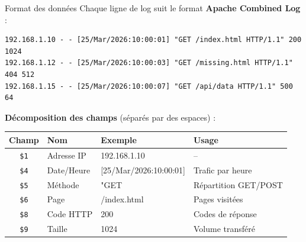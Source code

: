 \documentclass[aspectratio=169, 11pt]{beamer}
\begin{document}
\begin{frame}[fragile]{Format des données}
  Chaque ligne de log suit le format \textbf{Apache Combined Log} :

  \vspace{0.3em}
  \begin{lstlisting}[basicstyle=\ttfamily\tiny]
192.168.1.10 - - [25/Mar/2026:10:00:01] "GET /index.html HTTP/1.1" 200 1024
192.168.1.12 - - [25/Mar/2026:10:00:03] "GET /missing.html HTTP/1.1" 404 512
192.168.1.15 - - [25/Mar/2026:10:00:07] "GET /api/data HTTP/1.1" 500 64
  \end{lstlisting}

  \vspace{0.5em}
  \textbf{Décomposition des champs} (séparés par des espaces) :

  \vspace{0.3em}
  \centering
  \begin{tabular}{clll}
    \toprule
    \textbf{Champ} & \textbf{Nom} & \textbf{Exemple} & \textbf{Usage} \\
    \midrule
    \texttt{\$1} & Adresse IP & 192.168.1.10 & -- \\
    \texttt{\$4} & Date/Heure & [25/Mar/2026:10:00:01] & Trafic par heure \\
    \texttt{\$5} & Méthode & "GET & Répartition GET/POST \\
    \texttt{\$6} & Page & /index.html & Pages visitées \\
    \texttt{\$8} & Code HTTP & 200 & Codes de réponse \\
    \texttt{\$9} & Taille & 1024 & Volume transféré \\
    \bottomrule
  \end{tabular}
\end{frame}
\end{document}
